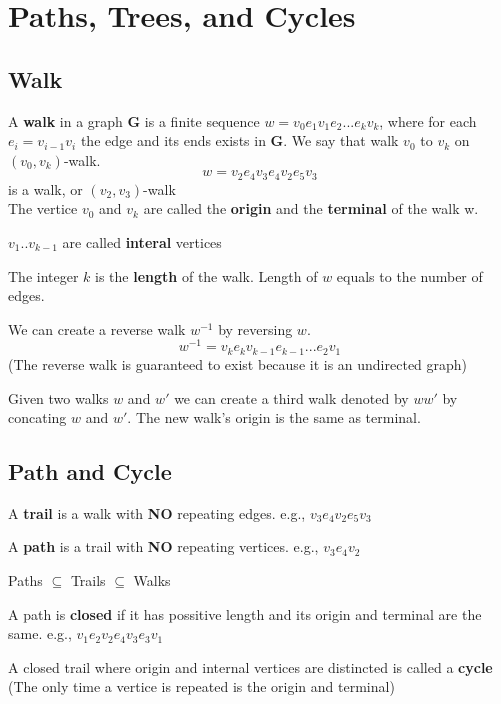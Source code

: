 	\chapter{Paths, Trees, and Cycles}
		\section{Walk}

			A \textbf{walk} in a graph \textbf{G} is a finite sequence $w=v_0e_1v_1e_2...e_kv_k$, where for each $e_i=v_{i-1}v_i$ the edge and its ends exists in \textbf{G}. We say that walk $v_0$ to $v_k$ on $(v_0, v_k)$-walk.
			\begin{equation}
				w = v_2e_4v_3e_4v_2e_5v_3
			\end{equation}
			is a walk, or $(v_2, v_3)$-walk\\
			The vertice $v_0$ and $v_k$ are called the \textbf{origin} and the \textbf{terminal} of the walk w.

			$v_1..v_{k-1}$ are called \textbf{interal} vertices

	 		The integer $k$ is the \textbf{length} of the walk. Length of $w$ equals to the number of edges.

	 		We can create a reverse walk $w^{-1}$ by reversing $w$.
	 		\begin{equation}
	 			w^{-1} = v_ke_kv_{k-1}e_{k-1}...e_2v_1
	 		\end{equation}
	 		(The reverse walk is guaranteed to exist because it is an undirected graph)

	 		Given two walks $w$ and $w'$ we can create a third walk denoted by $ww'$ by concating $w$ and $w'$. The new walk's origin is the same as terminal.

	 	\section{Path and Cycle}

	 		A \textbf{trail} is a walk with \textbf{NO} repeating edges. e.g., $v_3e_4v_2e_5v_3$

	 		A \textbf{path} is a trail with \textbf{NO} repeating vertices. e.g., $v_3e_4v_2$

	 		Paths $\subseteq$ Trails $\subseteq$ Walks

	 		A path is \textbf{closed} if it has possitive length and its origin and terminal are the same. e.g., $v_1e_2v_2e_4v_3e_3v_1$

	 		A closed trail where origin and internal vertices are distincted is called a \textbf{cycle} (The only time a vertice is repeated is the origin and terminal)

